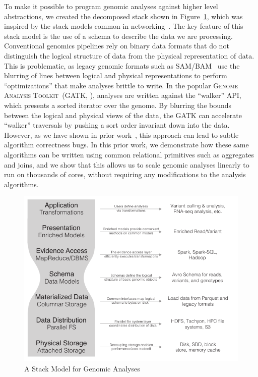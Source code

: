 \documentclass[11pt]{article} %
\begin{document}
To make it possible to program genomic analyses against higher level abstractions, we created the
decomposed stack shown in Figure~\ref{fig:stack-model}, which was inspired by the stack models
common in networking~\cite{zimmermann80}. The key feature of this stack model is the use of a
schema to describe the data we are processing. Conventional genomics pipelines rely on binary
data formats that do not distinguish the logical structure of data from the physical representation
of data. This is problematic, as legacy genomic formats such as SAM/BAM~\cite{li09} use the
blurring of lines between logical and physical representations to perform ``optimizations''
that make analyses brittle to write. In the popular \textsc{Genome Analysis Toolkit}~(GATK,
\cite{mckenna10}), analyses are written against the ``walker'' API, which presents a sorted
iterator over the genome. By blurring the bounds between the logical and physical views of the
data, the \textsc{GATK} can accelerate ``walker'' traversals by pushing a sort order invariant
down into the data. However, as we have shown in prior work~\cite{nothaft15}, this approach
can lead to subtle algorithm correctness bugs. In this prior work, we demonstrate how these
same algorithms can be written using common relational primitives such as aggregates and joins,
and we show that this allows us to scale genomic analyses linearly to run on thousands of cores,
without requiring any modifications to the analysis algorithms.

\begin{figure}[h]
\begin{center}
\includegraphics[width=0.6\linewidth]{../ms-thesis/expanded-stack-2.pdf}
\caption{A Stack Model for Genomic Analyses}
\label{fig:stack-model}
\end{center}
\end{figure}
\end{document}
